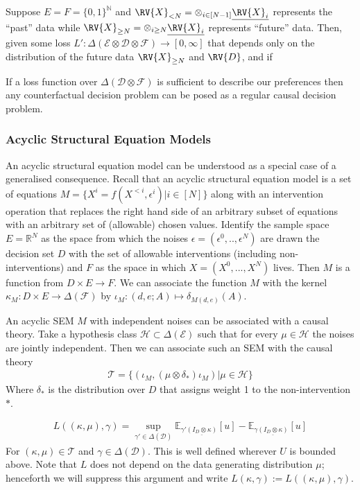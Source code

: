 Suppose $E=F=\{0,1\}^\mathbb{N}$ and $\RV{X}_{<N}=\otimes_{i\in [N-1]} \underline{\RV{X}_i}$ represents the ``past'' data while $\RV{X}_{\geq N}=\otimes_{i\geq N} \underline{\RV{X}_i}$ represents ``future'' data. Then, given some loss $L':\Delta(\mathcal{E}\otimes \mathcal{D}\otimes\mathcal{F})\to[0,\infty]$ that depends only on the distribution of the future data $\RV{X}_{\geq N}$ and $\RV{D}$, and if 

If a loss function over $\Delta(\mathcal{D}\otimes\mathcal{F})$ is sufficient to describe our preferences then any counterfactual decision problem can be posed as a regular causal decision problem.

\subsubsection{Acyclic Structural Equation Models}

An acyclic structural equation model can be understood as a special case of a generalised consequence. Recall that an acyclic structural equation model is a set of equations $M=\{X^i = f(X^{<i},\epsilon^i)|i\in[N]\}$ along with an intervention operation that replaces the right hand side of an arbitrary subset of equations with an arbitrary set of (allowable) chosen values. Identify the sample space $E=\mathbb{R}^N$ as the space from which the noises $\epsilon=(\epsilon^0,..,\epsilon^N)$ are drawn the decision set $D$ with the set of allowable interventions (including non-interventions) and $F$ as the space in which $X=(X^0,...,X^N)$ lives. Then $M$ is a function from $D\times E\to F$. We can associate the function $M$ with the kernel $\kappa_M: D\times E\to \Delta(\mathcal{F})$ by $\iota_M:(d,e;A)\mapsto \delta_{M(d,e)}(A)$.

An acyclic SEM $M$ with independent noises can be associated with a causal theory. Take a hypothesis class $\mathscr{H}\subset\Delta(\mathcal{E})$ such that for every $\mu\in\mathscr{H}$ the noises are jointly independent. Then we can associate such an SEM with the causal theory
\begin{align}
    \mathscr{T} = \{(\iota_M,(\mu\otimes \delta_*)\iota_M )|\mu\in\mathscr{H}\}
\end{align}
Where $\delta_*$ is the distribution over $D$ that assigns weight 1 to the non-intervention $*$.


\begin{align}
    L((\kappa,\mu),\gamma) = \sup_{\gamma'\in\Delta(\mathcal{D})} \mathbb{E}_{\gamma'\underline{(I_D\otimes \kappa)}}[u] - \mathbb{E}_{\gamma\underline{(I_D\otimes \kappa)}}[u]
\end{align}
For $(\kappa,\mu)\in \mathscr{T}$ and $\gamma\in \Delta(\mathcal{D})$. This is well defined wherever $U$ is bounded above. Note that $L$ does not depend on the data generating distribution $\mu$; henceforth we will suppress this argument and write $L(\kappa,\gamma):= L((\kappa,\mu),\gamma)$.


